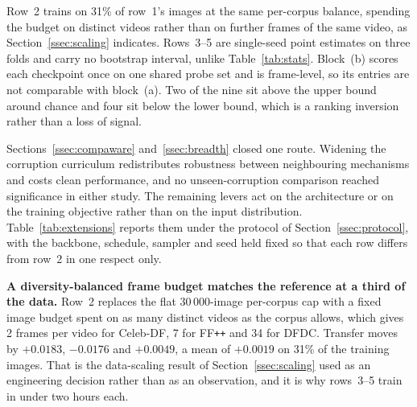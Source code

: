 \documentclass[journal,onecolumn]{IEEEtran}
\newcommand{\celebdf}{Celeb-DF}
\newcommand{\ffpp}{FF\texttt{++}}
\newcommand{\dfdc}{DFDC}
\begin{document}
\begin{table}[!ht]
\vspace{0.5ex}
\begin{minipage}{0.95\textwidth}
\footnotesize
Row~2 trains on 31\% of row~1's images at the same per-corpus balance, spending
the budget on distinct videos rather than on further frames of the same video,
as Section~\ref{ssec:scaling} indicates. Rows~3--5 are single-seed point
estimates on three folds and carry no bootstrap interval, unlike
Table~\ref{tab:stats}. Block~(b) scores each checkpoint once on one shared
probe set and is frame-level, so its entries are not comparable with block~(a).
Two of the nine sit above the upper bound around chance and four sit below the
lower bound, which is a ranking inversion rather than a loss of signal.
\end{minipage}
\end{table}

Sections~\ref{ssec:compaware} and~\ref{ssec:breadth} closed one route. Widening
the corruption curriculum redistributes robustness between neighbouring
mechanisms and costs clean performance, and no unseen-corruption comparison
reached significance in either study. The remaining levers act on the
architecture or on the training objective rather than on the input
distribution. Table~\ref{tab:extensions} reports them under the
protocol of Section~\ref{ssec:protocol}, with the backbone, schedule, sampler
and seed held fixed so that each row differs from row~2 in one respect only.

\textbf{A diversity-balanced frame budget matches the reference at a third of
the data.} Row~2 replaces the flat 30\,000-image per-corpus cap with a fixed
image budget spent on as many distinct videos as the corpus allows, which
gives 2 frames per video for \celebdf{}, 7 for \ffpp{} and 34 for \dfdc{}.
Transfer moves by $+0.0183$, $-0.0176$ and $+0.0049$, a mean of $+0.0019$ on
31\% of the training images. That is the data-scaling result of
Section~\ref{ssec:scaling} used as an engineering decision rather than as an
observation, and it is why rows~3--5 train in under two hours each.
\end{document}
